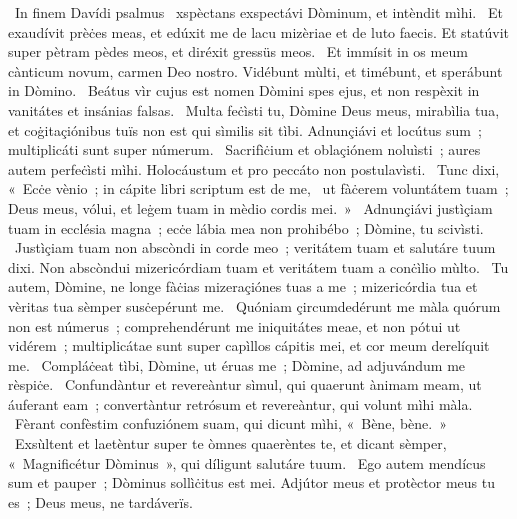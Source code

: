 {~In finem Davídi psalmus}
{%
~xspèctans exspectávi Dòminum, et intèndit mìhi.
~Et exaudívit prèċes meas, et edúxit me de lacu mizèriae et de luto faecis. Et statúvit super pètram pèdes meos, et diréxit gressüs meos.
~Et immísit in os meum cànticum novum, carmen Deo nostro. Vidébunt mùlti, et timébunt, et sperábunt in Dòmino.
~Beátus vìr cujus est nomen Dòmini spes ejus, et non respèxit in vanitátes et insánias falsas.
~Multa feċìsti tu, Dòmine Deus meus, mirabìlia tua, et coġitaçiónibus tuïs non est qui sìmilis sit tìbi. Adnunçiávi et locútus sum~; multiplicáti sunt super númerum.
~Sacrifìċium et oblaçiónem noluìsti~; aures autem perfeċìsti mìhi. Holocáustum et pro peccáto non postulavìsti.
~Tunc dixi, «~Ecċe vènio~; in cápite libri scriptum est de me,
~ut fàċerem voluntátem tuam~; Deus meus, vólui, et leġem tuam in mèdio cordis mei.~»
~Adnunçiávi justìçiam tuam in ecclésia magna~; ecċe lábia mea non prohibébo~; Dòmine, tu scivìsti.
~Justìçiam tuam non abscòndi in corde meo~; veritátem tuam et salutáre tuum dixi. Non abscòndui mizericórdiam tuam et veritátem tuam a conċìlio mùlto.
~Tu autem, Dòmine, ne longe fàċias mizeraçiónes tuas a me~; mizericórdia tua et vèritas tua sèmper susċepérunt me.
~Quóniam çircumdedérunt me màla quórum non est númerus~; comprehendérunt me iniquitátes meae, et non pótui ut vidérem~; multiplicátae sunt super capìllos cápitis mei, et cor meum derelíquit me.
~Compláċeat tìbi, Dòmine, ut éruas me~; Dòmine, ad adjuvándum me rèspiċe.
~Confundàntur et revereàntur sìmul, qui quaerunt ànimam meam, ut áuferant eam~; convertàntur retrósum et revereàntur, qui volunt mìhi màla.
~Fèrant confèstim confuziónem suam, qui dicunt mìhi, «~Bène, bène.~»
~Exsùltent et laetèntur super te òmnes quaerèntes te, et dicant sèmper, «~Magnificétur Dòminus~», qui díligunt salutáre tuum.
~Ego autem mendícus sum et pauper~; Dòminus sollìċitus est mei. Adjútor meus et protèctor meus tu es~; Deus meus, ne  tardáverïs.
}
